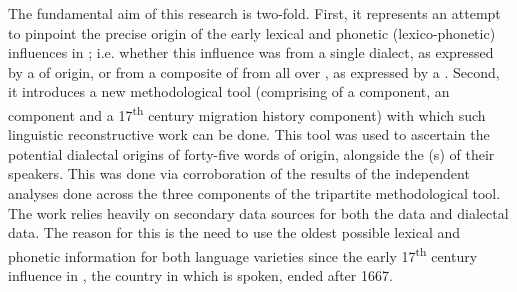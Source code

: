 \begin{refsection}

The fundamental aim of this research is two-fold. First, it represents an attempt to pinpoint the precise origin of the early  lexical and phonetic (lexico-phonetic) influences in ; i.e. whether this influence was from a single dialect, as expressed by a  of origin, or from a composite of  from all over , as expressed by a . Second, it introduces a new methodological tool (comprising of a  component, an   component and a 17\textsuperscript{th} century  migration history component) with which such linguistic reconstructive work can be done. This tool was used to ascertain the potential dialectal origins of forty-five  words of  origin, alongside the (s) of their speakers. This was done via corroboration of the results of the independent analyses done across the three components of the tripartite methodological tool. The work relies heavily on secondary data sources for both the  data and  dialectal data. The reason for this is the need to use the oldest possible lexical and phonetic information for both language varieties since the early 17\textsuperscript{th} century  influence in , the country in which  is spoken, ended after 1667.
\printbibliography[heading=subbibliography]
\end{refsection}

